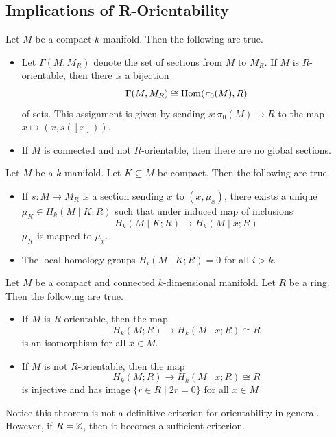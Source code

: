 \documentclass[a4paper]{article}
\begin{document}
\subsection{Implications of R-Orientability}
\begin{prp}{}{} Let $M$ be a compact $k$-manifold. Then the following are true. 
\begin{itemize}
\item Let $\Gamma(M,M_R)$ denote the set of sections from $M$ to $M_R$. If $M$ is $R$-orientable, then there is a bijection $$\Gamma(M,M_R)\cong\operatorname{Hom}(\pi_0(M),R)$$ of sets. This assignment is given by sending $s:\pi_0(M)\to R$ to the map $x\mapsto(x,s([x]))$. 
\item If $M$ is connected and not $R$-orientable, then there are no global sections. 
\end{itemize}
\end{prp}

\begin{prp}{}{} Let $M$ be a $k$-manifold. Let $K\subseteq M$ be compact. Then the following are true. 
\begin{itemize}
\item If $s:M\to M_R$ is a section sending $x$ to $(x,\mu_x)$, there exists a unique $\mu_K\in H_k(M\;|\;K;R)$ such that under induced map of inclusions $$H_k(M\;|\;K;R)\to H_k(M\;|\;x;R)$$ $\mu_K$ is mapped to $\mu_x$. 
\item The local homology groups $H_i(M\;|\;K;R)=0$ for all $i>k$. 
\end{itemize}
\end{prp}

\begin{thm}{}{} Let $M$ be a compact and connected $k$-dimensional manifold. Let $R$ be a ring. Then the following are true. 
\begin{itemize}
\item If $M$ is $R$-orientable, then the map $$H_k(M;R)\to H_k(M\;|\;x;R)\cong R$$ is an isomorphism for all $x\in M$. 
\item If $M$ is not $R$-orientable, then the map $$H_k(M;R)\to H_k(M\;|\;x;R)\cong R$$ is injective and has image $\{r\in R\;|\;2r=0\}$ for all $x\in M$
\end{itemize}
\end{thm}

Notice this theorem is not a definitive criterion for orientability in general. However, if $R=\mathbb{Z}$, then it becomes a sufficient criterion. 
\end{document}
